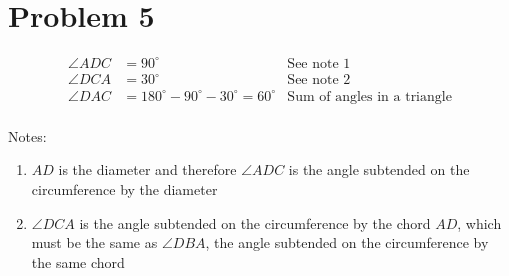 \section*{Problem 5}
\begin{align*}
    \angle ADC & = 90^\circ & \text{See note 1} \\
    \angle DCA & = 30^\circ & \text{See note 2} \\
    \angle DAC & = 180^\circ - 90^\circ - 30^\circ = 60^\circ & \text{Sum of angles in a triangle} \\
\end{align*}

Notes:
\begin{enumerate}
    \item{$ AD $ is the diameter and therefore $ \angle ADC $ is the angle subtended on the circumference by the diameter }
    \item{$ \angle DCA $ is the angle subtended on the circumference by the chord $ AD $, which must be the same as $ \angle  DBA $, the angle subtended on the circumference by the same chord}
\end{enumerate}
